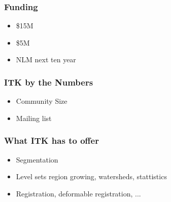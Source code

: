 \begin{frame}
\frametitle{Funding}
\begin{itemize}
\item \$15M
\pause
\item \$5M
\pause
\item NLM next ten year
\end{itemize}
\end{frame}


\begin{frame}
\frametitle{ITK by the Numbers}
\begin{itemize}
\item Community Size
\pause
\item Mailing list
\end{itemize}
\end{frame}


\begin{frame}
\frametitle{What ITK has to offer}
\begin{itemize}
\item Segmentation
\pause
\item Level sets region growing, watersheds, stattistics
\pause
\item Registration, deformable registration, ...
\end{itemize}
\end{frame}

